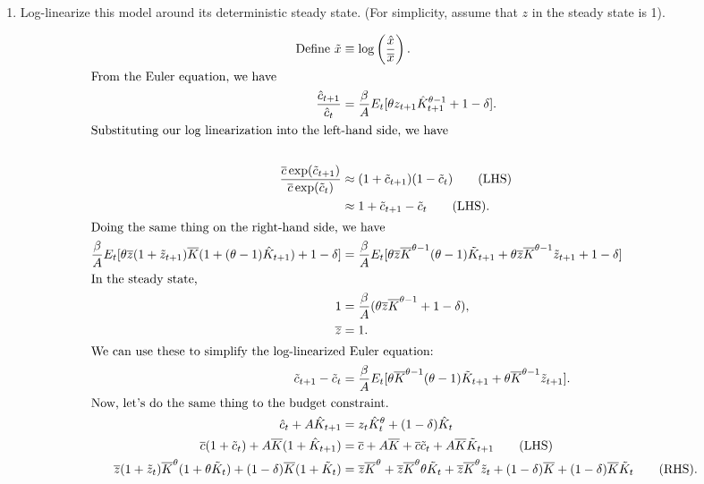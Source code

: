 \documentclass[11pt]{article}
\begin{document}
\begin{enumerate}
\newpage
\item 
 Log-linearize this model around its deterministic steady state. (For simplicity, assume that $z$ in the steady state is 1).

\begin{align*}
\text{Define } \tilde{x} &\equiv \log\left(\frac{\hat{x}}{\overline{x}}\right).\\
\intertext{From the Euler equation, we have}
\frac{\hat{c}_{t + 1}}{\hat{c}_t} &= \frac{\beta}{A} E_t [\theta z_{t + 1}\hat{K}^{\theta - 1}_{t + 1} + 1 - \delta].\\
\intertext{Substituting our log linearization into the left-hand side, we have}\\
\frac{\overline{c}\exp(\tilde{c}_{t + 1})}{\overline{c} \exp (\tilde{c}_t)} &\approx (1 + \tilde{c}_{t + 1})(1 - \tilde{c}_t)\tag{LHS}\\
&\approx 1 + \tilde{c}_{t + 1} - \tilde{c}_t \tag{LHS}.\\
\intertext{Doing the same thing on the right-hand side, we have}
\frac{\beta}{A} E_t [\theta \overline{z} (1 + \tilde{z}_{t + 1})\overline{K}(1 + (\theta - 1)\hat{K}_{t + 1}) + 1 - \delta] &=
\frac{\beta}{A} E_t [\theta \overline{z} \overline{K}^{\theta - 1}(\theta - 1)\tilde{K}_{t + 1} + \theta \overline{z} \overline{K}^{\theta - 1}\tilde{z}_{t + 1} + 1 - \delta]\\
\intertext{In the steady state,}
1 &= \frac{\beta}{A}(\theta \overline{z} \overline{K}^{\theta - 1} + 1 - \delta),\\
\overline{z} &= 1.\\
\intertext{We can use these to simplify the log-linearized Euler equation:} 
\tilde{c}_{t + 1} - \tilde{c}_t &= \frac{\beta}{A} E_t [\theta \overline{K}^{\theta - 1}(\theta - 1)\tilde{K}_{t + 1} + \theta \overline{K}^{\theta - 1} \tilde{z}_{t + 1}].\\
\intertext{Now, let's do the same thing to the budget constraint.}
\hat{c}_t + A\hat{K}_{t + 1} &= z_t \hat{K}_t^\theta + (1 - \delta)\hat{K}_t \\
\overline{c}(1 + \tilde{c}_t) + A \overline{K} (1 + \hat{K}_{t + 1}) &= \overline{c} + A\overline{K} + \overline{c}\tilde{c}_t + A\overline{K}\tilde{K}_{t + 1}\tag{LHS}\\
\overline{z}(1 + \tilde{z}_t)\overline{K}^\theta (1 + \theta \tilde{K}_t) + (1 - \delta)\overline{K}(1 + \tilde{K}_t) &=
\overline{z} \overline{K}^\theta + \overline{z} \overline{K}^\theta \theta \tilde{K}_t + \overline{z} \overline{K}^\theta \tilde{z}_t + (1 - \delta) \overline{K} + (1 - \delta)\overline{K} \tilde{K}_t \tag{RHS}.\\

\end{align*}
\end{enumerate}
\end{document}
